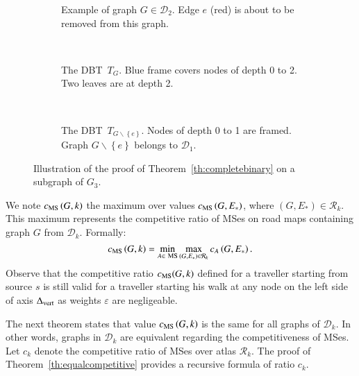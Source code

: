 \documentclass[preprint]{elsarticle}
\newcommand{\set}[1]{\left\{ #1 \right\}}
\newcommand{\mcalr}{\mathcal{R}}
\newcommand{\mcald}{\mathcal{D}}
\newcommand{\mts}{MS}
\newcommand{\deltavert}{\Delta_{\mbox{\scriptsize{vert}}}}
\newcommand{\cms}{c_{\mbox{\scriptsize{MS}}}}
\newcommand{\ebt}{DBT}
\begin{document}
\begin{figure}[h]
\centering
\begin{subfigure}[b]{0.3\columnwidth}
\centering
\scalebox{.40}{}
\caption{Example of graph $G \in \mcald_2$. Edge $e$ (red) is about to be removed from this graph.}
\label{subfig:proofth1_a}
\end{subfigure}
~
\begin{subfigure}[b]{0.3\columnwidth}
\centering
\scalebox{.55}{}
\caption{The \ebt ~$T_{G}$. Blue frame covers nodes of depth 0 to 2. Two leaves are at depth 2.}
\label{subfig:proofth1_b}
\end{subfigure}
~
\begin{subfigure}[b]{0.3\columnwidth}
\centering
\scalebox{.55}{}
\caption{The \ebt ~$T_{G \backslash \set{e}}$. Nodes of depth 0 to 1 are framed. Graph $G\backslash \set{e}$ belongs to $\mcald_1$.}
\label{subfig:proofth1_c}
\end{subfigure}
\caption{Illustration of the proof of Theorem~\ref{th:completebinary} on a subgraph of $G_3$.}
\label{fig:proofth1}
\end{figure}


We note $\cms\left(G, k\right)$ the maximum over values $\cms\left(G,E_*\right)$, where $\left(G,E_*\right) \in \mcalr_k$. This maximum represents the competitive ratio of \mts es on road maps containing graph $G$ from $\mcald_k$. Formally: 
\begin{equation}
\cms\left(G, k\right) = \min\limits_{A \in ~\mbox{\scriptsize {MS}}} \max\limits_{\left(G,E_*\right) \in \mcalr_k} c_A\left(G,E_*\right).
\label{eq:cmsg}
\end{equation}
Observe that the competitive ratio $\cms(G,k)$ defined for a traveller starting from source $s$ is still valid for a traveller starting his walk at any node on the left side of axis $\deltavert$ as weights $\varepsilon$ are negligeable. 

The next theorem states that value $\cms\left(G, k\right)$ is the same for all graphs of $\mcald_k$. In other words, graphs in $\mcald_k$ are equivalent regarding the competitiveness of \mts es. Let $c_k$ denote the competitive ratio of \mts es over atlas $\mcalr_k$. The proof of Theorem~\ref{th:equalcompetitive} provides a recursive formula of ratio $c_k$.
\end{document}
